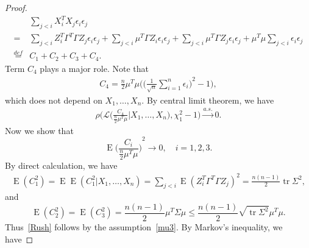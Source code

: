\documentclass[review]{elsarticle}
\DeclareMathOperator{\mytr}{tr}
\DeclareMathOperator{\myE}{E}
\theoremstyle{plain}
\theoremstyle{definition}
\theoremstyle{remark}
\begin{document}
\begin{proof}
    \begin{equation*}
        \begin{aligned}
            &\sum_{j<i} X_i^T X_j \epsilon_i\epsilon_j\\
            =&
            \sum_{j<i} Z_i^T \Gamma^T \Gamma Z_j \epsilon_i\epsilon_j
            +
            \sum_{j<i} \mu^T \Gamma Z_i \epsilon_i\epsilon_j
            +\sum_{j<i} \mu^T \Gamma Z_j \epsilon_i\epsilon_j+
            \mu^T \mu \sum_{j<i} \epsilon_i\epsilon_j\\
            \overset{def}{=}&C_1+C_2+C_3+C_4.
        \end{aligned}
    \end{equation*}
Term $C_4$ plays a major role. Note that
    \begin{equation*}
        \begin{aligned}
            C_4=\frac{n}{2}\mu^T \mu\Big({\Big(\frac{1}{\sqrt{n}}\sum_{i=1}^n \epsilon_i\Big)}^2-1\Big),
        \end{aligned}
    \end{equation*}
    which does not depend on $X_1,\ldots,X_n$.
By central limit theorem, we have
    \begin{equation}\label{Rush2}
        \begin{aligned}
            \rho\Big(\mathcal{L}\Big(\frac{C_4}{\frac{n}{2}\mu^T \mu}\Big| X_1,\ldots,X_n\Big),\chi^2_1-1\Big)\xrightarrow{a.s.} 0.
        \end{aligned}
    \end{equation}
Now we show that
    \begin{equation}\label{Rush}
    \myE{\Big(\frac{C_i}{\frac{n}{2}\mu^T\mu}\Big)}^2\to 0,
    \quad i=1,2,3.
    \end{equation}
    By direct calculation, we have
    \begin{equation*}
    \begin{aligned}
    \myE(C_1^2)=\myE\myE(C_1^2|X_1,\ldots,X_n)
    =\sum_{j<i}\myE{(Z_i^T \Gamma^T \Gamma Z_j)}^2=\frac{n(n-1)}{2}\mytr \Sigma^2,
    \end{aligned}
\end{equation*}
    and
    \begin{equation*}
    \myE(C_2^2)=\myE(C_3^2)=\frac{n(n-1)}{2}\mu^T \Sigma \mu\leq \frac{n(n-1)}{2}\sqrt{\mytr \Sigma^2}\mu^T\mu.
    \end{equation*}
    Thus~\eqref{Rush} follows by the assumption~\eqref{mu3}. By Markov's inequality, we have

\end{proof}
\end{document}
